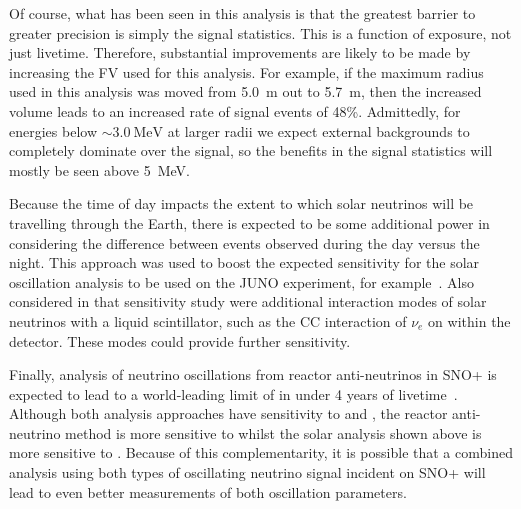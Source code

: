 Of course, what has been seen in this analysis is that the greatest barrier to greater precision is simply the signal statistics. This is a function of exposure, not just livetime. Therefore, substantial improvements are likely to be made by increasing the FV used for this analysis. For example, if the maximum radius used in this analysis was moved from \SI{5.0}{\metre} out to \SI{5.7}{\metre}, then the increased volume leads to an increased rate of signal events of 48\%. Admittedly, for energies below $\sim\SI{3.0}{\MeV}$ at larger radii we expect external backgrounds to completely dominate over the signal, so the benefits in the signal statistics will mostly be seen above \SI{5}{\MeV}.

Because the time of day impacts the extent to which solar neutrinos will be travelling through the Earth, there is expected to be some additional power in considering the difference between events observed during the day versus the night. This approach was used to boost the expected sensitivity for the solar oscillation analysis to be used on the JUNO experiment, for example~\cite{junocollaborationFeasibilityPhysicsPotential2020,junocollaborationModelIndependentApproach2022}. %
Also considered in that sensitivity study were additional interaction modes of solar neutrinos with a liquid scintillator, such as the CC interaction of $\nu_{e}$ on  within the detector. These modes could provide further sensitivity.

Finally, analysis of neutrino oscillations from reactor anti-neutrinos in SNO+ is expected to lead to a world-leading limit of \dmsq{} in under 4 years of livetime~\cite{morton-blakeFirstMeasurementReactor2021}. Although both analysis approaches have sensitivity to \dmsq{} and \tonetwo{}, the reactor anti-neutrino method is more sensitive to \dmsq{} whilst the solar analysis shown above is more sensitive to \tonetwo{}. Because of this complementarity, it is possible that a combined analysis using both types of oscillating neutrino signal incident on SNO+ will lead to even better measurements of both oscillation parameters.


